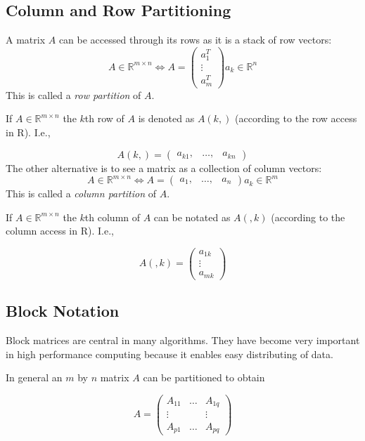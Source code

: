 \subsection{Column and Row Partitioning}

A matrix $A$ can be accessed through its rows as it is a stack of row
vectors:
$$ A \in \mathbb{R}^{m \times n} \Longleftrightarrow A = 
\left( \begin{array}{c}
a_{1}^T \\
\vdots \\
a_{m}^T 
\end{array} \right)
a_{k} \in \mathbb{R}^n 
$$
This is called a \textit{row partition} of $A$.


If $A \in \mathbb{R}^{m \times n}$ the $k$th row of $A$ is denoted
as $A(k,)$ (according to the row access in R). I.e.,

$$ A(k,) = \left( \begin{array}{ccc}
a_{k1}, & \ldots, & a_{kn}
\end{array} \right)
$$
The other alternative is to see a matrix as a collection of column
vectors:
$$ A \in \mathbb{R}^{m \times n} \Longleftrightarrow A = 
\left( \begin{array}{ccc}
a_{1}, & \ldots, & a_{n}
\end{array} \right)
a_{k} \in \mathbb{R}^m 
 $$
This is called a \textit{column partition} of $A$.

If $A \in \mathbb{R}^{m \times n}$ the $k$th column of $A$ can be notated
as $A(,k)$ (according to the column access in R). I.e.,

$$ A(,k) = \left( \begin{array}{c}
a_{1k} \\
\vdots \\
a_{mk} 
\end{array} \right)
 $$

\subsection{Block Notation}
\label{sec:blocknot}
Block matrices are central in many algorithms. They have become very
important in high performance computing because it enables
easy distributing of data. 

In general an $m$ by $n$ matrix $A$ can be partitioned to obtain

$$ 
A = \left( \begin{array}{ccc}
A_{11} & \ldots & A_{1q} \\
\vdots &        & \vdots \\
A_{p1} & \ldots & A_{pq}
\end{array} \right)
$$

